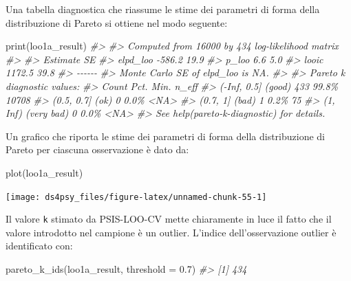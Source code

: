 \documentclass[
  11pt,
]{krantz}
\makeatletter
\newenvironment{Shaded}{\begin{snugshade}}{\end{snugshade}}
\newcommand{\AttributeTok}[1]{\textcolor[rgb]{0.61,0.61,0.61}{#1}}
\newcommand{\CommentTok}[1]{\textcolor[rgb]{0.37,0.37,0.37}{\textit{#1}}}
\newcommand{\FloatTok}[1]{\textcolor[rgb]{0.06,0.06,0.06}{#1}}
\newcommand{\FunctionTok}[1]{\textcolor[rgb]{0,0,0}{#1}}
\newcommand{\NormalTok}[1]{#1}
\newenvironment{kframe}{%
\medskip{}
\setlength{\fboxsep}{.8em}
 \def\at@end@of@kframe{}%
 \ifinner\ifhmode%
  \def\at@end@of@kframe{\end{minipage}}%
  \begin{minipage}{\columnwidth}%
 \fi\fi%
 \def\FrameCommand##1{\hskip\@totalleftmargin \hskip-\fboxsep
 \colorbox{shadecolor}{##1}\hskip-\fboxsep
     \hskip-\linewidth \hskip-\@totalleftmargin \hskip\columnwidth}%
 \MakeFramed {\advance\hsize-\width
   \@totalleftmargin\z@ \linewidth\hsize
   \@setminipage}}%
 {\par\unskip\endMakeFramed%
 \at@end@of@kframe}
\renewenvironment{Shaded}{\begin{kframe}}{\end{kframe}}
\theoremstyle{definition}
\theoremstyle{definition}
\theoremstyle{definition}
\theoremstyle{definition}
\theoremstyle{remark}
\makeatother
\begin{document}
Una tabella diagnostica che riassume le stime dei parametri di forma della distribuzione di Pareto si ottiene nel modo seguente:

\begin{Shaded}
\begin{Highlighting}[]
\FunctionTok{print}\NormalTok{(loo1a\_result)}
\CommentTok{\#\textgreater{} }
\CommentTok{\#\textgreater{} Computed from 16000 by 434 log{-}likelihood matrix}
\CommentTok{\#\textgreater{} }
\CommentTok{\#\textgreater{}          Estimate   SE}
\CommentTok{\#\textgreater{} elpd\_loo   {-}586.2 19.9}
\CommentTok{\#\textgreater{} p\_loo         6.6  5.0}
\CommentTok{\#\textgreater{} looic      1172.5 39.8}
\CommentTok{\#\textgreater{} {-}{-}{-}{-}{-}{-}}
\CommentTok{\#\textgreater{} Monte Carlo SE of elpd\_loo is NA.}
\CommentTok{\#\textgreater{} }
\CommentTok{\#\textgreater{} Pareto k diagnostic values:}
\CommentTok{\#\textgreater{}                          Count Pct.    Min. n\_eff}
\CommentTok{\#\textgreater{} ({-}Inf, 0.5]   (good)     433   99.8\%   10708     }
\CommentTok{\#\textgreater{}  (0.5, 0.7]   (ok)         0    0.0\%   \textless{}NA\textgreater{}      }
\CommentTok{\#\textgreater{}    (0.7, 1]   (bad)        1    0.2\%   75        }
\CommentTok{\#\textgreater{}    (1, Inf)   (very bad)   0    0.0\%   \textless{}NA\textgreater{}      }
\CommentTok{\#\textgreater{} See help(\textquotesingle{}pareto{-}k{-}diagnostic\textquotesingle{}) for details.}
\end{Highlighting}
\end{Shaded}

Un grafico che riporta le stime dei parametri di forma della distribuzione di Pareto per ciascuna osservazione è dato da:

\begin{Shaded}
\begin{Highlighting}[]
\FunctionTok{plot}\NormalTok{(loo1a\_result)}
\end{Highlighting}
\end{Shaded}

\begin{center}\texttt{[image: ds4psy\_files/figure-latex/unnamed-chunk-55-1]} \end{center}

Il valore \texttt{k} stimato da PSIS-LOO-CV mette chiaramente in luce il fatto che il valore introdotto nel campione è un outlier. L'indice dell'osservazione outlier è identificato con:

\begin{Shaded}
\begin{Highlighting}[]
\FunctionTok{pareto\_k\_ids}\NormalTok{(loo1a\_result, }\AttributeTok{threshold =} \FloatTok{0.7}\NormalTok{)}
\CommentTok{\#\textgreater{} [1] 434}
\end{Highlighting}
\end{Shaded}
\end{document}
